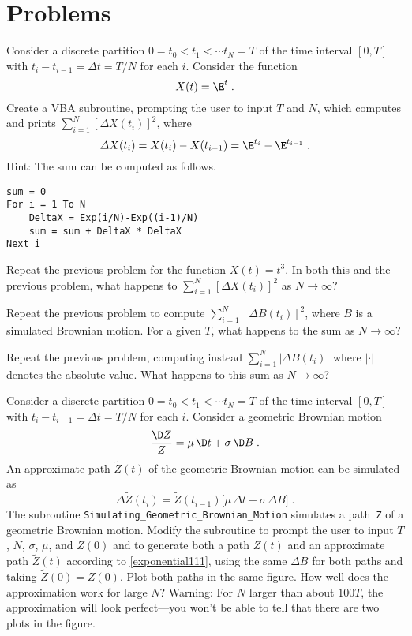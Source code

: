 \section*{Problems}
\begin{prob} Consider a discrete partition $0=t_0 < t_1 < \cdots t_N=T$ of the time interval $[0,T]$ with $t_i - t_{i-1} = \varDelta t = T/N$ for each $i$.  Consider the function 
$$X(t)=\E^t\; .$$
Create a VBA subroutine, prompting the user to input $T$ and $N$, which computes and prints $\sum_{i=1}^N [\varDelta X(t_i)]^2$, where 
$$\varDelta X(t_i) = X(t_i)-X(t_{i-1}) = \E^{t_i} - \E^{t_{i-1}}\; .$$
Hint: The sum can be computed as follows.
\small\begin{verbatim}
sum = 0
For i = 1 To N
    DeltaX = Exp(i/N)-Exp((i-1)/N)
    sum = sum + DeltaX * DeltaX
Next i
\end{verbatim}\normalsize
\end{prob}\begin{prob} Repeat the previous problem for the function $X(t) = t^3$.  In both this and the previous problem, what happens to $\sum_{i=1}^N [\varDelta X(t_i)]^2$ as $N \rightarrow \infty$?
\end{prob}\begin{prob} Repeat the previous problem to compute $\sum_{i=1}^N [\varDelta B(t_i)]^2$, where $B$ is a simulated Brownian motion.  For a given $T$, what happens to the sum as $N \rightarrow \infty$?  
\end{prob}\begin{prob} Repeat the previous problem, computing instead $\sum_{i=1}^N |\varDelta B(t_i)|$ where $| \cdot |$ denotes the absolute value.  What happens to this sum as $N \rightarrow \infty$?
\end{prob}\begin{prob} Consider a discrete partition $0=t_0 < t_1 < \cdots t_N=T$ of the time interval $[0,T]$ with $t_i - t_{i-1} = \varDelta t = T/N$ for each $i$.  Consider a geometric Brownian motion
$$\frac{\D Z}{Z} = \mu\,\D t + \sigma\,\D B\; .$$
An approximate path $\tilde{Z}(t)$ of the geometric Brownian motion can be simulated as
\begin{equation}\label{exponential111}
\varDelta \tilde{Z}(t_i) = \tilde{Z}(t_{i-1}) \big[ \mu\,\varDelta t + \sigma\,\varDelta B\big]\;.
\end{equation}
The subroutine \verb!Simulating_Geometric_Brownian_Motion! simulates a path~\verb!Z! of a geometric Brownian motion. Modify the subroutine to prompt the user to input $T$, $N$, $\sigma$, $\mu$, and $Z(0)$ and to generate both a path $Z(t)$ and an approximate path $\tilde{Z}(t)$ according to \eqref{exponential111}, using the same $\varDelta B$  for both paths and taking $\tilde{Z}(0) = Z(0)$.  Plot both paths in the same figure.  How well does the approximation work for large $N$?   Warning:  
For $N$ larger than about $100 T$, the approximation will look perfect---you won't be able to tell that there are two plots in the figure.
\end{prob}

